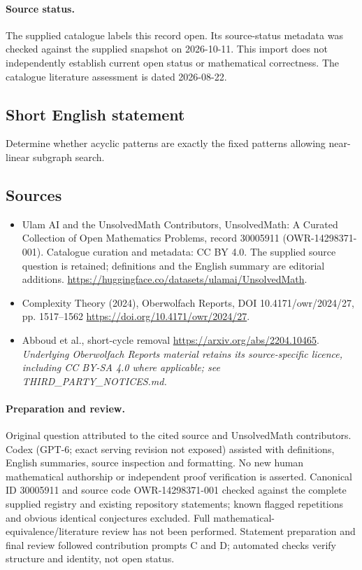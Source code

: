 \documentclass[11pt]{article}
\begin{document}
\paragraph{Source status.}
The supplied catalogue labels this record open. Its source-status metadata was checked against the supplied snapshot on 2026-10-11. This import does not independently establish current open status or mathematical correctness. The catalogue literature assessment is dated 2026-08-22.
\subsection{Short English statement}
Determine whether acyclic patterns are exactly the fixed patterns allowing near-linear subgraph search.
\subsection{Sources}
\begin{itemize}
\item[S1] Ulam AI and the UnsolvedMath Contributors, UnsolvedMath: A Curated Collection of Open Mathematics Problems, record 30005911 (OWR-14298371-001). Catalogue curation and metadata: CC BY 4.0. The supplied source question is retained; definitions and the English summary are editorial additions.
\url{https://huggingface.co/datasets/ulamai/UnsolvedMath}.
\item[S2] Complexity Theory (2024), Oberwolfach Reports, DOI 10.4171/owr/2024/27, pp. 1517--1562
\url{https://doi.org/10.4171/owr/2024/27}.
\item[S3] Abboud et al., short-cycle removal
\url{https://arxiv.org/abs/2204.10465}.
\textit{Underlying Oberwolfach Reports material retains its source-specific licence, including CC BY-SA 4.0 where applicable; see THIRD\_PARTY\_NOTICES.md.}
\end{itemize}
\paragraph{Preparation and review.}
Original question attributed to the cited source and UnsolvedMath contributors. Codex (GPT-6; exact serving revision not exposed) assisted with definitions, English summaries, source inspection and formatting. No new human mathematical authorship or independent proof verification is asserted. Canonical ID 30005911 and source code OWR-14298371-001 checked against the complete supplied registry and existing repository statements; known flagged repetitions and obvious identical conjectures excluded. Full mathematical-equivalence/literature review has not been performed. Statement preparation and final review followed contribution prompts C and D; automated checks verify structure and identity, not open status.
\label{end:30005911}
\end{document}
